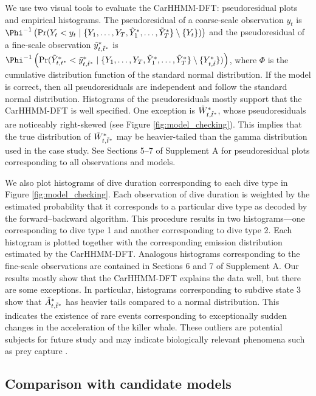 We use two visual tools to evaluate the CarHHMM-DFT: pseudoresidual plots and empirical histograms. The pseudoresidual of a coarse-scale observation $y_t$ is $\Phi^{-1} \left(\mathrm{Pr}(Y_t < y_t \mid \{Y_1,\ldots,Y_T,\Z_1,\ldots,\Z_T\} \setminus \{Y_t\}) \right)$ and the pseudoresidual of a fine-scale observation $\tilde{y}^*_{t,\tilde t^*}$ is $\Phi^{-1} \left(\mathrm{Pr}(\Z_{t,t^*} < \z_{t,\tilde t^*} \mid \{Y_1,\ldots,Y_T,\Z_1,\ldots,\Z_T\} \setminus \{Y^*_{t,\tilde t}\}) \right)$, where $\Phi$ is the cumulative distribution function of the standard normal distribution. If the model is correct, then all pseudoresiduals are independent and follow the standard normal distribution. Histograms of the pseudoresiduals mostly support that the CarHHMM-DFT is well specified. One exception is $\tilde{W}^*_{t,\tilde t^*}$, whose pseudoresiduals are noticeably right-skewed (see Figure \ref{fig:model_checking}). This implies that the true distribution of $\tilde{W}^*_{t,\tilde t^*}$ may be heavier-tailed than the gamma distribution used in the case study. See Sections 5--7 of Supplement A for pseudoresidual plots corresponding to all observations and models.

We also plot histograms of dive duration corresponding to each dive type in Figure \ref{fig:model_checking}. Each observation of dive duration is weighted by the estimated probability that it corresponds to a particular dive type as decoded by the forward--backward algorithm. This procedure results in two histograms---one corresponding to dive type 1 and another corresponding to dive type 2. Each histogram is plotted together with the corresponding emission distribution estimated by the CarHHMM-DFT. Analogous histograms corresponding to the fine-scale observations are contained in Sections 6 and 7 of Supplement A. Our results mostly show that the CarHHMM-DFT explains the data well, but there are some exceptions. In particular, histograms corresponding to subdive state 3 show that $\tilde{A}^*_{t,\tilde t^*}$ has heavier tails compared to a normal distribution. This indicates the existence of rare events corresponding to exceptionally sudden changes in the acceleration of the killer whale. These outliers are potential subjects for future study and may indicate biologically relevant phenomena such as prey capture \citep{Tennessen:2019a}.

\subsection{Comparison with candidate models}

